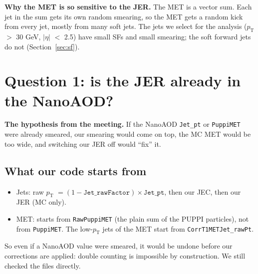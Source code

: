\documentclass[11pt,a4paper]{article}
\newcommand{\pt}{$p_\mathrm{T}$}
\newcommand{\aeta}{$|\eta|$}
\begin{document}
\textbf{Why the MET is so sensitive to the JER.} The MET is a vector sum. Each jet in the sum gets its own random
smearing, so the MET gets a random kick from every jet, mostly from many soft jets. The jets we select for the analysis
(\pt{} $>$ 30 GeV, \aeta{} $<$ 2.5) have small SFs and small smearing; the soft forward jets do not
(Section~\ref{sec:sf}).

\section{Question 1: is the JER already in the NanoAOD?}
\label{sec:q1}

\textbf{The hypothesis from the meeting.} If the NanoAOD \texttt{Jet\_pt} or \texttt{PuppiMET} were already
smeared, our smearing would come on top, the MC MET would be too wide, and switching our JER off would ``fix'' it.

\subsection{What our code starts from}
\begin{itemize}
\item Jets: raw \pt{} $= (1-\texttt{Jet\_rawFactor})\times\texttt{Jet\_pt}$, then our JEC, then our JER (MC only).
\item MET: starts from \texttt{RawPuppiMET} (the plain sum of the PUPPI particles), not from \texttt{PuppiMET}. The low-\pt{}
jets of the MET start from \texttt{CorrT1METJet\_rawPt}.
\end{itemize}
So even if a NanoAOD value were smeared, it would be undone before our corrections are applied: double counting is
impossible by construction. We still checked the files directly.
\end{document}
